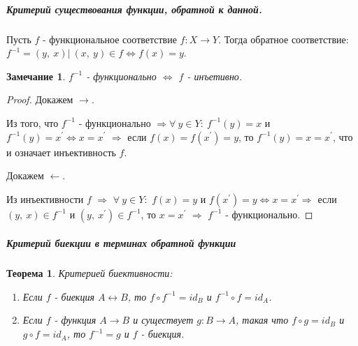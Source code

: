 \documentclass[a4paper,12pt]{article}
\newtheorem*{theorem}{Теорема}
\newtheorem*{Note}{Замечание}
\newcommand{\p}{^{\prime}}
\begin{document}
        \subparagraph{Критерий существования функции, обратной к данной.}
        Пусть $f$ - функциональное соответствие $f:X \rightarrow Y$. Тогда обратное соответствие: $f^{-1} = {(y,\ x)|\ (x,\ y) \in f \Leftrightarrow f(x) = y}$.

        \begin{Note} $f^{-1}$ - функционально $\Leftrightarrow$ $f$ - инъетивно.
        \end{Note}

        \begin{proof}

        Докажем $\rightarrow$. 

        Из того, что $f^{-1}$ - функционально $\Rightarrow \forall\ y \in Y:\ f^{-1}(y) = x$ и $f^{-1}(y) = x\p \Leftrightarrow x = x\p$ $\Rightarrow$ если $f(x) = f(x\p) = y$, то $f^{-1}(y) = x = x\p$, что и означает инъективность $f$. 

        Докажем $\leftarrow$.

        Из инъективности $f$ $\Rightarrow$ $\forall\ y \in Y:$  $f(x) = y$ и $f(x\p) = y \Leftrightarrow x = x\p \Rightarrow$ если $(y,\ x) \in f^{-1}$ и $(y,\ x\p) \in f^{-1}$, то $x = x\p$ $\Rightarrow$ $f^{-1}$ - функционально.
        \end{proof} 

        \subparagraph{Критерий биекции в терминах обратной функции}
        \begin{theorem} Критерией биективности:
            \begin{enumerate}
                \item Если $f$ - биекция $A \leftrightarrow B$, 
                то $f \circ f^{-1} = id_B$ и
                            $f^{-1} \circ f = id_A$.       
                \item Если $f$ - функция $A \rightarrow B$ и существует $g: B \rightarrow A$, такая что $f \circ g = id_B$ и $g \circ f = id_A$, то $f^{-1} = g$ и $f$ - биекция.    
            \end{enumerate} 
        \end{theorem}
\end{document}
